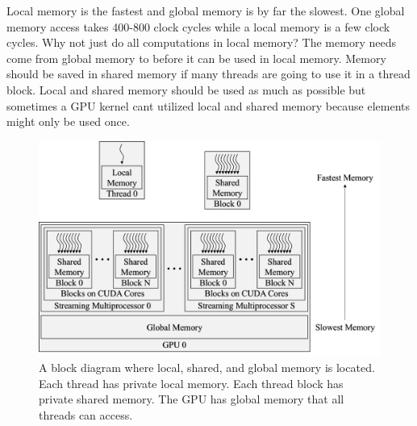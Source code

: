 Local memory is the fastest and global memory is by far the slowest.
One global memory access takes 400-800 clock cycles while a local memory is a few clock cycles.
Why not just do all computations in local memory?
The memory needs come from global memory to before it can be used in local memory.
Memory should be saved in shared memory if many threads are going to use it in a thread block.
Local and shared memory should be used as much as possible but sometimes a GPU kernel cant utilized local and shared memory because elements might only be used once.
\begin{figure}
	\centering\includegraphics[width=9in/100*55]{figures/gpu_intro/fullGPUmemBlockDiagram.png}
	\caption{A block diagram where local, shared, and global memory is located. Each thread has private local memory. Each thread block has private shared memory. The GPU has global memory that all threads can access.}
	\label{fig:fullGPUmemBlockDiagram}
\end{figure}

